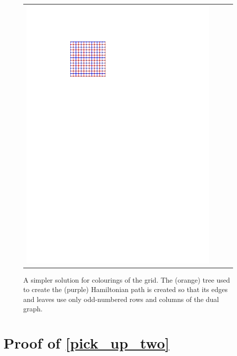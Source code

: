 \documentclass{patmorin}
\begin{document}
\begin{figure}
\begin{tabular}{cccc}
    \includegraphics[page=4]{figs/omer}
  \end{tabular}
  \caption{A simpler solution for colourings of the grid. The (orange) tree used to create the (purple) Hamiltonian path is created so that its edges and leaves use only odd-numbered rows and columns of the dual graph.}
  \label{omer}
\end{figure}






\appendix
\section{Proof of \cref{pick_up_two}}
\label{pick_up_two_proof}


\pickuptwo*
\end{document}
